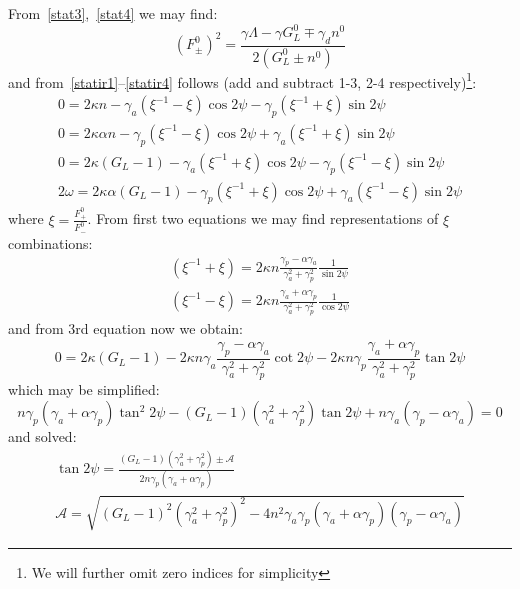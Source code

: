 \documentclass[12pt, notitlepage]{report}
\begin{document}
From~\eqref{stat3},~\eqref{stat4} we may find:
\begin{equation}
	\label{Fpm}
	(F_\pm^0)^2 = \frac{\gamma \Lambda - \gamma G^0_L \mp \gamma_d n^0}{2(G^0_L\pm n^0)}
\end{equation}
and from~\eqref{statir1}--\eqref{statir4} follows (add and subtract 1-3, 2-4 respectively)\footnote{We will further omit zero indices for simplicity}:
\begin{gather}
	0 = 2\kappa n - \gamma_a \left( \xi^{-1} - \xi \right)\cos 2\psi - \gamma_p \left(\xi^{-1} + \xi\right)\sin 2\psi \\
	0 = 2\kappa \alpha n  - \gamma_p \left(\xi^{-1} - \xi\right)\cos 2\psi + \gamma_a \left( \xi^{-1} + \xi \right)\sin 2\psi \\
	0 = 2\kappa\left(G_L - 1 \right) - \gamma_a \left(\xi^{-1} + \xi\right)\cos 2\psi - \gamma_p \left( \xi^{-1} - \xi \right)\sin 2\psi \\
	2\omega = 2\kappa \alpha \left(G_L - 1\right) - \gamma_p \left(\xi^{-1} + \xi\right)\cos 2\psi + \gamma_a \left( \xi^{-1} - \xi \right)\sin 2\psi
\end{gather}
where $\xi = \frac{F^0_+}{F^0_-}$. From first two equations we may find representations of $\xi$ combinations:
\begin{gather}
	\label{eqxi1}
	\left(\xi^{-1} + \xi\right) = 2\kappa n \frac{\gamma_p - \alpha\gamma_a}{\gamma_a^2 + \gamma_p^2}\frac{1}{\sin2\psi} \\
	\label{eqxi2}
	\left(\xi^{-1} - \xi\right) = 2\kappa n \frac{\gamma_a + \alpha\gamma_p}{\gamma_a^2 + \gamma_p^2}\frac{1}{\cos 2\psi}	
\end{gather}
and from 3rd equation now we obtain:
\begin{equation}
	\label{tanraw}
	0 = 2\kappa\left(G_L - 1 \right) -  2\kappa n\gamma_a \frac{\gamma_p - \alpha\gamma_a}{\gamma_a^2 + \gamma_p^2}\cot 2\psi -  2\kappa n\gamma_p \frac{\gamma_a + \alpha\gamma_p}{\gamma_a^2 + \gamma_p^2}\tan 2\psi
\end{equation}
which may be simplified:
\begin{equation}
	\label{eqtan}
n\gamma_p\left(\gamma_a + \alpha\gamma_p\right) \tan^2 2\psi - \left(G_L - 1\right)\left(\gamma_a^2 + \gamma_p^2\right)\tan 2\psi + n\gamma_a\left(\gamma_p-\alpha\gamma_a\right) = 0
\end{equation}
and solved:
\begin{gather}
	\tan 2\psi = \frac{(G_L-1)(\gamma_a^2 + \gamma_p^2) \pm \mathcal{A}}{2n\gamma_p(\gamma_a+\alpha\gamma_p)}\\
	\mathcal{A} = \sqrt{(G_L-1)^2(\gamma_a^2+\gamma_p^2)^2 - 4n^2\gamma_a\gamma_p(\gamma_a+\alpha\gamma_p)(\gamma_p - \alpha\gamma_a)}
\end{gather}
\end{document}
